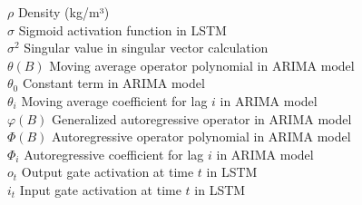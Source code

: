 \begin{tabbing}
$\rho$ \> Density (kg/m³) \\
$\sigma$ \> Sigmoid activation function in LSTM \\
$\sigma^2$ \> Singular value in singular vector calculation \\
$\theta(B)$ \> Moving average operator polynomial in ARIMA model \\
$\theta_0$ \> Constant term in ARIMA model \\
$\theta_i$ \> Moving average coefficient for lag $i$ in ARIMA model \\
$\varphi(B)$ \> Generalized autoregressive operator in ARIMA model \\
$\Phi(B)$ \> Autoregressive operator polynomial in ARIMA model \\
$\Phi_i$ \> Autoregressive coefficient for lag $i$ in ARIMA model \\
$o_t$ \> Output gate activation at time $t$ in LSTM \\
$i_t$ \> Input gate activation at time $t$ in LSTM \\
\end{tabbing}

